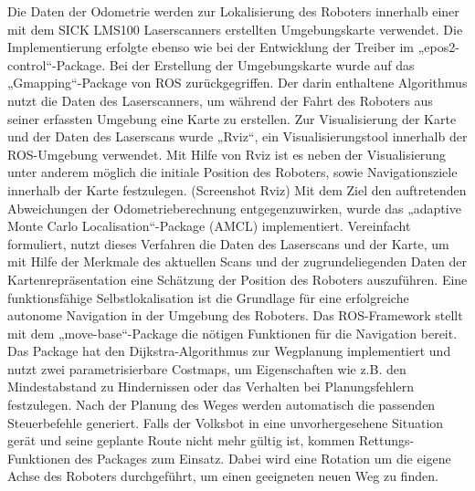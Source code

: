 Die Daten der Odometrie werden zur Lokalisierung des Roboters innerhalb einer mit dem SICK LMS100 Laserscanners erstellten Umgebungskarte verwendet. Die Implementierung erfolgte ebenso wie bei der Entwicklung der Treiber im „epos2-control“-Package. Bei der Erstellung der Umgebungskarte wurde auf das „Gmapping“-Package von ROS zurückgegriffen. Der darin enthaltene Algorithmus nutzt die Daten des Laserscanners, um während der Fahrt des Roboters aus seiner erfassten Umgebung eine Karte zu erstellen. Zur Visualisierung der Karte und der Daten des Laserscans wurde „Rviz“, ein Visualisierungstool innerhalb der ROS-Umgebung verwendet. Mit Hilfe von Rviz ist es neben der Visualisierung unter anderem möglich die initiale Position des Roboters, sowie Navigationsziele innerhalb der Karte festzulegen. (Screenshot Rviz) Mit dem Ziel den auftretenden Abweichungen der Odometrieberechnung entgegenzuwirken, wurde das „adaptive Monte Carlo Localisation“-Package (AMCL) implementiert. Vereinfacht formuliert, nutzt dieses Verfahren die Daten des Laserscans und der Karte, um mit Hilfe der Merkmale des aktuellen Scans und der zugrundeliegenden Daten der Kartenrepräsentation eine Schätzung der Position des Roboters auszuführen. \cite[S. 6]{Bischoff:2004}
Eine funktionsfähige Selbstlokalisation ist die Grundlage für eine erfolgreiche autonome Navigation in der Umgebung des Roboters. Das ROS-Framework stellt mit dem „move-base“-Package die nötigen Funktionen für die Navigation bereit. Das Package hat den Dijkstra-Algorithmus zur Wegplanung implementiert und nutzt zwei parametrisierbare Costmaps, um Eigenschaften wie z.B. den Mindestabstand zu Hindernissen oder das Verhalten bei Planungsfehlern festzulegen. Nach der Planung des Weges werden automatisch die passenden Steuerbefehle generiert. Falls der Volksbot in eine unvorhergesehene Situation gerät und seine geplante Route nicht mehr gültig ist, kommen Rettungs-Funktionen des Packages zum Einsatz. Dabei wird eine Rotation um die eigene Achse des Roboters durchgeführt, um einen geeigneten neuen Weg zu finden. 

